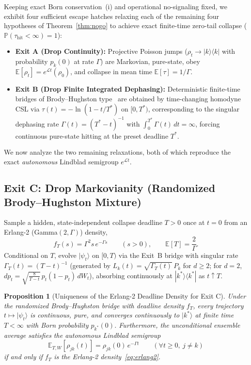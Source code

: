 \documentclass[aps,pra,10pt,twocolumn,superscriptaddress,amsmath,amssymb,floatfix]{revtex4-2}
\newtheorem{proposition}{Proposition}
\newcommand{\E}{\mathbb{E}}
\newcommand{\Prob}{\mathbb{P}}
\newcommand{\ket}[1]{|#1\rangle}
\newcommand{\ketbra}[2]{|#1\rangle\langle #2|}
\begin{document}
Keeping exact Born conservation~(i) and operational no-signaling fixed, we exhibit four sufficient escape hatches relaxing each of the remaining four hypotheses of Theorem~\ref{thm:nogo} to achieve exact finite-time zero-tail collapse ($\Prob(\tau_{\mathrm{hit}} < \infty) = 1$):
\begin{itemize}
\item \textbf{Exit A (Drop Continuity):} Projective Poisson jumps ($\rho_t \to \ketbra{k}{k}$ with probability $p_k(0)$ at rate $\Gamma$) are Markovian, pure-state, obey $\E[\rho_t]=e^{\mathcal{L}t}(\rho_0)$, and collapse in mean time $\E[\tau] = 1/\Gamma$.
\item \textbf{Exit B (Drop Finite Integrated Dephasing):} Deterministic finite-time bridges of Brody--Hughston type~\cite{BrodyHughston2005,BrodyHughston2006} are obtained by time-changing homodyne CSL via $\tau(t) = -\ln(1 - t/T^*)$ on $[0, T^*)$, corresponding to the singular dephasing rate $\Gamma(t) = (T^*-t)^{-1}$ with $\int_0^{T^*}\Gamma(t)\,dt = \infty$, forcing continuous pure-state hitting at the preset deadline $T^*$.
\end{itemize}
We now analyze the two remaining relaxations, both of which reproduce the exact \emph{autonomous} Lindblad semigroup $e^{\mathcal{L}t}$.

\subsection{Exit C: Drop Markovianity (Randomized Brody--Hughston Mixture)}
\label{sec:exitC}

Sample a hidden, state-independent collapse deadline $T > 0$ once at $t=0$ from an Erlang-2 (Gamma$(2,\Gamma)$) density,
\begin{equation}
\label{eq:erlang2}
f_T(s) = \Gamma^2 s\, e^{-\Gamma s} \qquad (s > 0), \qquad \E[T] = \frac{2}{\Gamma}.
\end{equation}
Conditional on $T$, evolve $\ket{\psi_t}$ on $[0, T)$ via the Exit~B bridge with singular rate $\Gamma_T(t) = (T-t)^{-1}$ (generated by $L_k(t) = \sqrt{\Gamma_T(t)}\,P_k$ for $d \ge 2$; for $d=2$, $dp_t = \sqrt{\frac{8}{T-t}}\,p_t(1-p_t)\,dW_t$), absorbing continuously at $\ketbra{k^*}{k^*}$ as $t \uparrow T$.

\begin{proposition}[Uniqueness of the Erlang-2 Deadline Density for Exit C]
Under the randomized Brody--Hughston bridge with deadline density $f_T$, every trajectory $t \mapsto \ket{\psi_t}$ is continuous, pure, and converges continuously to $\ket{k^*}$ at finite time $T<\infty$ with Born probability $p_{k^*}(0)$. Furthermore, the unconditional ensemble average satisfies the autonomous Lindblad semigroup
\begin{equation}
\label{eq:exitC_lindblad}
\E_{T,W}[\rho_{jk}(t)] = \rho_{jk}(0)\, e^{-\Gamma t} \qquad (\forall t \ge 0,\ j \ne k)
\end{equation}
if and only if $f_T$ is the Erlang-2 density~\eqref{eq:erlang2}.
\end{proposition}
\end{document}
